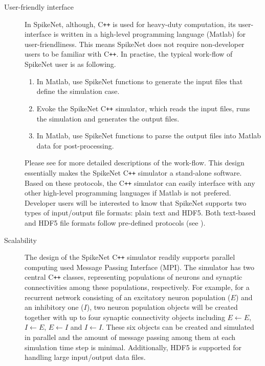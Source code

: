 \documentclass{article}
\begin{document}
\begin{description}
\item [User-friendly interface] In SpikeNet, although, C\texttt{++}  is used for heavy-duty computation, its user-interface is written in a high-level programming language (Matlab) for user-friendliness. This means SpikeNet does not require non-developer users to be familiar with C\texttt{++}. In practise, the typical work-flow of SpikeNet user is as following.
\begin{enumerate}
\item In Matlab, use SpikeNet functions to generate the input files that define the simulation case.
\item Evoke the SpikeNet C\texttt{++} simulator, which reads the input files, runs the simulation and generates the output files.
\item In Matlab, use SpikeNet functions to parse the output files into Matlab data for post-processing.
\end{enumerate}
Please see  for more detailed descriptions of the work-flow. 
This design essentially makes the SpikeNet C\texttt{++} simulator a stand-alone software. 
Based on these protocols, the C\texttt{++} simulator can easily interface with any other high-level programming languages if Matlab is not prefered.
Developer users will be interested to know that SpikeNet supports two types of input/output file formats: plain text and HDF5.
Both text-based and HDF5 file formats follow pre-defined protocols (see ). 

\item [Scalability] The design of the SpikeNet C\texttt{++} simulator readily supports parallel computing used Message Passing Interface (MPI). The simulator has two central C\texttt{++} classes, representing populations of neurons and synaptic connectivities among these populations, respectively. For example, for a recurrent network consisting of an excitatory neuron population ($E$) and an inhibitory one ($I$), two neuron population objects will be created together with up to four synaptic connectivity objects including $E\leftarrow E$, $I\leftarrow E$, $E\leftarrow I$ and $I\leftarrow I$. These six objects can be created and simulated in parallel and the amount of message passing among them at each simulation time step is minimal.  Additionally, HDF5 is supported for handling large input/output data files.
\end{description}
 
\end{document}
